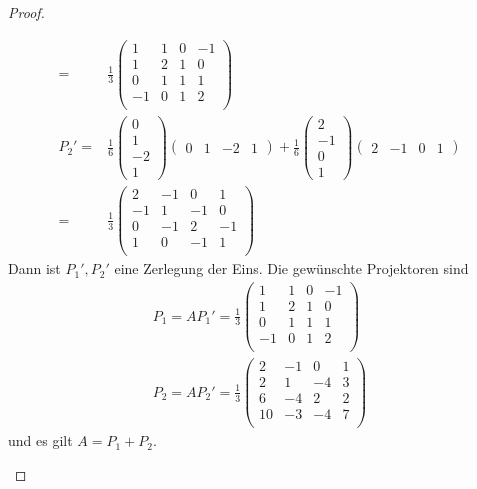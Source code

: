 \begin{proof}
\begin{parts}
\begin{align*}
		=&\frac{1}{3}\left(
\begin{array}{cccc}
 1 & 1 & 0 & -1 \\
 1 & 2 & 1 & 0 \\
 0 & 1 & 1 & 1 \\
 -1 & 0 & 1 & 2 \\
\end{array}
\right) \\
			P_2'=&\frac{1}{6}\begin{pmatrix}  0 \\ 1 \\ -2 \\ 1 \end{pmatrix} \begin{pmatrix} 0 & 1 & -2 & 1 \end{pmatrix} +\frac{1}{6}\begin{pmatrix} 2 \\ -1 \\ 0 \\ 1 \end{pmatrix} \begin{pmatrix} 2 & -1 & 0 & 1 \end{pmatrix}\\
			=&\frac{1}{3}\left(
\begin{array}{cccc}
 2 & -1 & 0 & 1 \\
 -1 & 1 & -1 & 0 \\
 0 & -1 & 2 & -1 \\
 1 & 0 & -1 & 1 \\
\end{array}
\right) 
	\end{align*}
	Dann ist $P_1',P_2'$ eine Zerlegung der Eins. Die gewünschte Projektoren sind
	\begin{gather*}
		P_1=AP_1'=\frac{1}{3}\left(
\begin{array}{cccc}
 1 & 1 & 0 & -1 \\
 1 & 2 & 1 & 0 \\
 0 & 1 & 1 & 1 \\
 -1 & 0 & 1 & 2 \\
\end{array}
\right)\\
P_2=AP_2'=\frac{1}{3}\left(
\begin{array}{cccc}
 2 & -1 & 0 & 1 \\
 2 & 1 & -4 & 3 \\
 6 & -4 & 2 & 2 \\
 10 & -3 & -4 & 7 \\
\end{array}
\right) 
	\end{gather*}
	und es gilt $A=P_1+P_2$.\qedhere
	\end{parts}
\end{proof}
